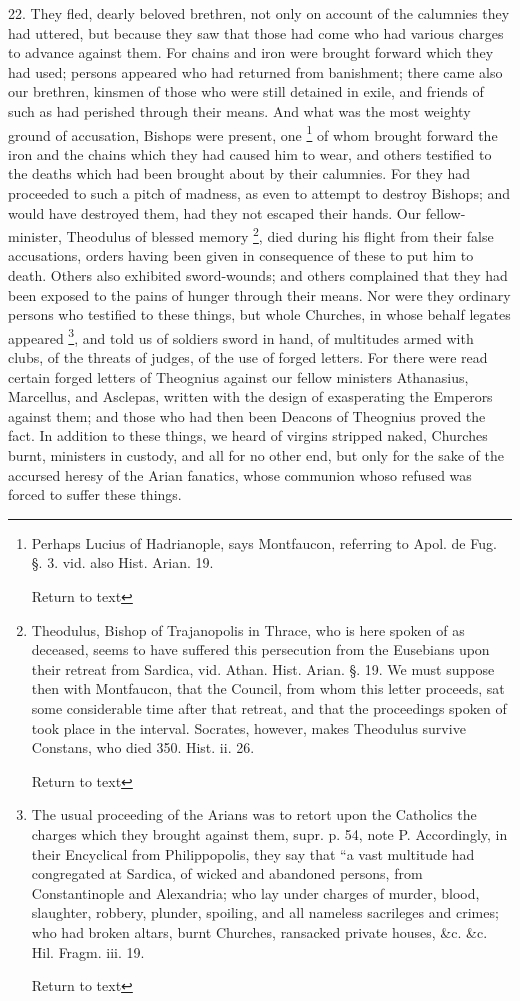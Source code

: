 22. They fled, dearly beloved brethren, not only
on account of the calumnies they had uttered, but because they saw
that those had come who had various charges to advance against them.
For chains and iron were brought forward which they had used; persons
appeared who had returned from banishment; there came also our
brethren, kinsmen of those who were still detained in exile, and
friends of such as had perished through their means. And what was the
most weighty ground of accusation, Bishops were present, one \footnote{Perhaps Lucius of Hadrianople, says
Montfaucon, referring to Apol. de Fug. §. 3. vid. also Hist. Arian.
19.

Return to text}
of whom brought forward the iron and the chains which they had caused
him to wear, and others testified to the deaths which had been brought
about by their calumnies. For they had proceeded to such a pitch of
madness, as even to attempt to destroy Bishops; and would have
destroyed them, had they not escaped their hands. Our fellow-minister,
Theodulus of blessed memory \footnote{Theodulus, Bishop of Trajanopolis in Thrace,
who is here spoken of as deceased, seems to have suffered this
persecution from the Eusebians upon their retreat from Sardica, vid.
Athan. Hist. Arian. §. 19. We must suppose then with Montfaucon, that
the Council, from whom this letter proceeds, sat some considerable
time after that retreat, and that the proceedings spoken of took place
in the interval. Socrates, however, makes Theodulus survive Constans,
who died 350. Hist. ii. 26.

Return to text}, died during his flight from
their false accusations, orders having been given in consequence of
these to put him to death. Others also exhibited sword-wounds; and
others complained that they had been exposed to the pains of hunger
through their means. Nor were they ordinary persons who testified to
these things, but whole Churches, in whose behalf legates appeared \footnote{The usual proceeding of the Arians was to
retort upon the Catholics the charges which they brought against them,
supr. p. 54, note P. Accordingly, in their Encyclical from
Philippopolis, they say that ``a vast multitude had congregated at
Sardica, of wicked and abandoned persons, from Constantinople and
Alexandria; who lay under charges of murder, blood, slaughter,
robbery, plunder, spoiling, and all nameless sacrileges and crimes;
who had broken altars, burnt Churches, ransacked private houses,
\&c. \&c. Hil. Fragm. iii. 19.

Return to text}, and told us of soldiers sword in hand, of multitudes armed
with clubs, of the threats of judges, of the use of forged letters.
For there were read certain forged letters of Theognius against our
fellow ministers Athanasius, Marcellus, and Asclepas, written with the
design of exasperating the Emperors against them; and those who had
then been Deacons of Theognius proved the fact. In addition to these
things, we heard of virgins stripped naked, Churches burnt,
ministers in custody, and all for no other end, but only for the sake
of the accursed heresy of the Arian fanatics, whose communion whoso
refused was forced to suffer these things.

